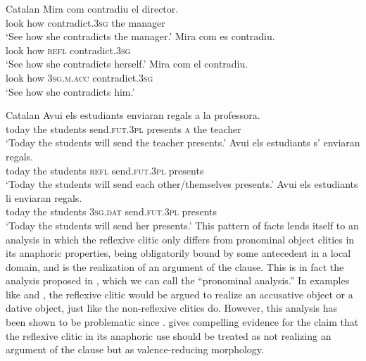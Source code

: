 \documentclass[output=paper,hidelinks]{langscibook}
\begin{document}
\ea\label{ex:Romance:20}   Catalan
\ea\label{ex:Romance:20a}
\gll
Mira com contradiu el director.\\
look how contradict.3\textsc{sg} the manager\\
\glt   `See how she contradicts the manager.'
\ex\label{ex:Romance:20b}
\gll
Mira com es contradiu.\\
       look how \textsc{refl} contradict.3\textsc{sg}\\
\glt   `See how she contradicts herself.'
\ex\label{ex:Romance:20c}
\gll
Mira com el contradiu.\\
look how 3\textsc{sg.m.acc} contradict.3\textsc{sg}\\
\glt   `See how she contradicts him.'
\z\z

\ea\label{ex:Romance:21} Catalan
\ea\label{ex:Romance:21a}
\gll
Avui els estudiants enviaran regals a la professora.\\
today the students send.\textsc{fut.3pl} presents \textsc{a} the teacher\\
\glt   `Today the students will send the teacher presents.'
\ex\label{ex:Romance:21b}
\gll
Avui els estudiants s' enviaran regals.\\
today the students \textsc{refl} send.\textsc{fut.3pl} presents\\
\glt   `Today the students will send each other/themselves presents.'
\ex\label{ex:Romance:21c}
\gll
Avui els estudiants li enviaran regals.\\
 today the students 3\textsc{sg.}\textsc{dat} send.\textsc{fut.3pl} presents\\
 \glt   `Today the students will send her presents.'
 \z\z
This pattern of facts lends itself to an analysis in which the reflexive clitic only differs from pronominal object clitics in its anaphoric properties, being obligatorily bound by some antecedent in a local domain, and is the realization of an argument of the clause. This is in fact the analysis proposed in \citet{AlencarKelling2005}, which we can call the ``pronominal analysis.'' In examples like  and , the reflexive clitic would be argued to realize an accusative object or a dative object, just like the non-reflexive clitics do. However, this analysis has been shown to be problematic since \citet{Grimshaw1982}. \citet{Grimshaw1982,Grimshaw90} gives compelling evidence for the claim that the reflexive clitic in its anaphoric use should be treated as not realizing an argument of the clause but as valence-reducing morphology.
\end{document}
